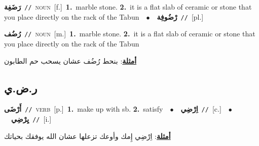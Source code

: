\documentclass[10pt,a4paper,twoside]{article} %
\begin{document}
\begin{multicols}{2}
{\setlength\topsep{0pt}\textbf{\foreignlanguage{arabic}{رَضَفِة}}\ {\color{gray}\texttt{//}\color{black}}\ \textsc{noun}\ [f.]\ \textbf{1.}~marble stone.  \textbf{2.}~it  is a flat slab of ceramic or stone that you place directly on the rack of the Tabun\ \ $\bullet$\ \ \setlength\topsep{0pt}\textbf{\foreignlanguage{arabic}{رْضُوفِة}}\ {\color{gray}\texttt{//}\color{black}}\ [pl.]\ } \vspace{2mm}

{\setlength\topsep{0pt}\textbf{\foreignlanguage{arabic}{رُضُف}}\ {\color{gray}\texttt{//}\color{black}}\ \textsc{noun}\ [m.]\ \textbf{1.}~marble stone.  \textbf{2.}~it  is a flat slab of ceramic or stone that you place directly on the rack of the Tabun\  \begin{flushright}\color{gray}\foreignlanguage{arabic}{\textbf{\underline{\foreignlanguage{arabic}{أمثلة}}}: بنحط رُضُف عشان يسحب حم الطابون}\end{flushright}\color{black}} \vspace{2mm}

\vspace{-3mm}
\subsection*{\color{blue}\foreignlanguage{arabic}{ر.ض.ي}\color{blue}{}} 

{\setlength\topsep{0pt}\textbf{\foreignlanguage{arabic}{أَرْضَى}}\ {\color{gray}\texttt{//}\color{black}}\ \textsc{verb}\ [p.]\ \textbf{1.}~make up with sb.  \textbf{2.}~satisfy\ \ $\bullet$\ \ \setlength\topsep{0pt}\textbf{\foreignlanguage{arabic}{اِرْضِي}}\ {\color{gray}\texttt{//}\color{black}}\ [c.]\ \ $\bullet$\ \ \setlength\topsep{0pt}\textbf{\foreignlanguage{arabic}{يِرْضِي}}\ {\color{gray}\texttt{//}\color{black}}\ [i.]\  \begin{flushright}\color{gray}\foreignlanguage{arabic}{\textbf{\underline{\foreignlanguage{arabic}{أمثلة}}}: اِرْضِي إِمك وأوعك تزعلها عشان الله يوفقك بحياتك}\end{flushright}\color{black}} \vspace{2mm}


\end{multicols}
\end{document}
